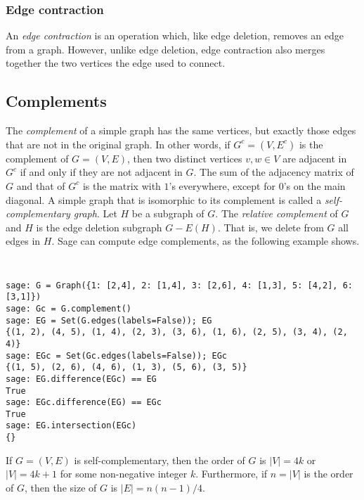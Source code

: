 \subsubsection{Edge contraction}

An \emph{edge contraction} is an operation which, like edge deletion,
removes an edge from a graph. However, unlike edge deletion, edge
contraction also merges together the two vertices the edge used to
connect.



\subsection{Complements}

The \emph{complement} of a simple graph has the same vertices, but
exactly those edges that are not in the original graph. In other
words, if $G^c = (V, E^c)$ is the complement of $G = (V,E)$, then two
distinct vertices $v,w \in V$ are adjacent in $G^c$ if and only if
they are not adjacent in $G$. The sum of the adjacency matrix of $G$
and that of $G^c$ is the matrix with $1$'s everywhere, except for
$0$'s on the main diagonal. A simple graph that is isomorphic to its
complement is called a \emph{self-complementary graph}. Let $H$ be a
subgraph of $G$. The \emph{relative complement} of $G$ and $H$ is the
edge deletion subgraph $G - E(H)$. That is, we delete from $G$ all
edges in $H$.
Sage can compute edge complements, as the following example shows.
%
\begin{center}
\fontsize{9pt}{9pt}
\selectfont
\tt
\begin{lstlisting}
sage: G = Graph({1: [2,4], 2: [1,4], 3: [2,6], 4: [1,3], 5: [4,2], 6: [3,1]})
sage: Gc = G.complement()
sage: EG = Set(G.edges(labels=False)); EG
{(1, 2), (4, 5), (1, 4), (2, 3), (3, 6), (1, 6), (2, 5), (3, 4), (2, 4)}
sage: EGc = Set(Gc.edges(labels=False)); EGc
{(1, 5), (2, 6), (4, 6), (1, 3), (5, 6), (3, 5)}
sage: EG.difference(EGc) == EG
True
sage: EGc.difference(EG) == EGc
True
sage: EG.intersection(EGc)
{}
\end{lstlisting}
\end{center}

\begin{theorem}
If $G = (V, E)$ is self-complementary, then the order of $G$ is
$|V| = 4k$ or $|V| = 4k + 1$ for some non-negative integer
$k$. Furthermore, if $n = |V|$ is the order of $G$, then the size of
$G$ is $|E| = n(n - 1) / 4$.
\end{theorem}

